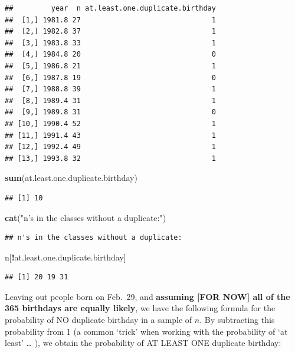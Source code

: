 \documentclass[]{book}
\newenvironment{Shaded}{\begin{snugshade}}{\end{snugshade}}
\newcommand{\KeywordTok}[1]{\textcolor[rgb]{0.13,0.29,0.53}{\textbf{#1}}}
\newcommand{\NormalTok}[1]{#1}
\newcommand{\OperatorTok}[1]{\textcolor[rgb]{0.81,0.36,0.00}{\textbf{#1}}}
\newcommand{\StringTok}[1]{\textcolor[rgb]{0.31,0.60,0.02}{#1}}
\begin{document}
\begin{verbatim}
##         year  n at.least.one.duplicate.birthday
##  [1,] 1981.8 27                               1
##  [2,] 1982.8 37                               1
##  [3,] 1983.8 33                               1
##  [4,] 1984.8 20                               0
##  [5,] 1986.8 21                               1
##  [6,] 1987.8 19                               0
##  [7,] 1988.8 39                               1
##  [8,] 1989.4 31                               1
##  [9,] 1989.8 31                               0
## [10,] 1990.4 52                               1
## [11,] 1991.4 43                               1
## [12,] 1992.4 49                               1
## [13,] 1993.8 32                               1
\end{verbatim}

\begin{Shaded}
\begin{Highlighting}[]
\KeywordTok{sum}\NormalTok{(at.least.one.duplicate.birthday)}
\end{Highlighting}
\end{Shaded}

\begin{verbatim}
## [1] 10
\end{verbatim}

\begin{Shaded}
\begin{Highlighting}[]
\KeywordTok{cat}\NormalTok{(}\StringTok{"n's in the classes without a duplicate:"}\NormalTok{)}
\end{Highlighting}
\end{Shaded}

\begin{verbatim}
## n's in the classes without a duplicate:
\end{verbatim}

\begin{Shaded}
\begin{Highlighting}[]
\NormalTok{n[}\OperatorTok{!}\NormalTok{at.least.one.duplicate.birthday]}
\end{Highlighting}
\end{Shaded}

\begin{verbatim}
## [1] 20 19 31
\end{verbatim}

Leaving out people born on Feb.~29, and \textbf{assuming {[}FOR NOW{]} all of the 365 birthdays are equally likely}, we have the following formula for the probability of NO duplicate birthday in a sample of \(n\). By subtracting this probability from 1 (a common `trick' when working with the probability of `at least' \ldots{} ), we obtain the probability of AT LEAST ONE duplicate birthday:
\end{document}

